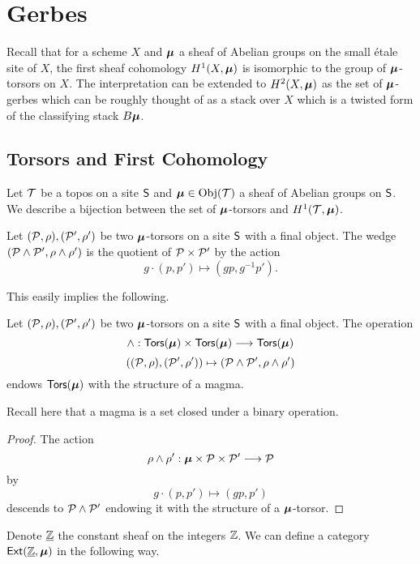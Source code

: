 \section{Gerbes}\label{sec: gerbes}
Recall that for a scheme $X$ and $\bm{\mu}$ a sheaf of Abelian groups on the small \'{e}tale site of $X$, the first sheaf cohomology $H^{1}(X,\bm{\mu})$ is isomorphic to the group of $\bm{\mu}$-torsors on $X$. The interpretation can be extended to $H^{2}(X,\bm{\mu})$ as the set of $\bm{\mu}$-gerbes which can be roughly thought of as a stack over $X$ which is a twisted form of the classifying stack $B\bm{\mu}$. 
\subsection{Torsors and First Cohomology}\label{subsec: torsors and first cohomology}
Let $\mathcal{T}$ be a topos on a site $\mathsf{S}$ and $\bm{\mu}\in\mathrm{Obj}(\mathcal{T})$ a sheaf of Abelian groups on $\mathsf{S}$. We describe a bijection between the set of $\bm{\mu}$-torsors and $H^{1}(\mathcal{T},\bm{\mu})$. 
\begin{definition}\label{def: wedge of torsors}
    Let $(\mathcal{P},\rho),(\mathcal{P}',\rho')$ be two $\bm{\mu}$-torsors on a site $\mathsf{S}$ with a final object. The wedge $(\mathcal{P}\wedge\mathcal{P}',\rho\wedge\rho')$ is the quotient of $\mathcal{P}\times\mathcal{P}'$ by the action 
    $$g\cdot(p,p')\mapsto(gp,g^{-1}p').$$
\end{definition}
This easily implies the following. 
\begin{proposition}\label{def: magma on wedge of torsors}
    Let $(\mathcal{P},\rho),(\mathcal{P}',\rho')$ be two $\bm{\mu}$-torsors on a site $\mathsf{S}$ with a final object. The operation 
    $$\wedge:\mathsf{Tors}(\bm{\mu})\times\mathsf{Tors}(\bm{\mu})\longrightarrow\mathsf{Tors}(\bm{\mu})$$
    $$\left((\mathcal{P},\rho),(\mathcal{P}',\rho')\right)\mapsto\left(\mathcal{P}\wedge\mathcal{P}',\rho\wedge\rho'\right)$$
    endows $\mathsf{Tors}(\bm{\mu})$ with the structure of a magma.
\end{proposition}
\begin{remark}
    Recall here that a magma is a set closed under a binary operation. 
\end{remark}
\begin{proof}
    The action
    $$\rho\wedge\rho':\bm{\mu}\times\mathcal{P}\times\mathcal{P}'\longrightarrow\mathcal{P}$$
    by 
    $$g\cdot (p,p')\mapsto(gp,p')$$
    descends to $\mathcal{P}\wedge\mathcal{P}'$ endowing it with the structure of a $\bm{\mu}$-torsor. 
\end{proof}
Denote $\underline{\mathbb{Z}}$ the constant sheaf on the integers $\mathbb{Z}$. We can define a category $\mathsf{Ext}(\underline{\mathbb{Z}},\bm{\mu})$ in the following way. 
